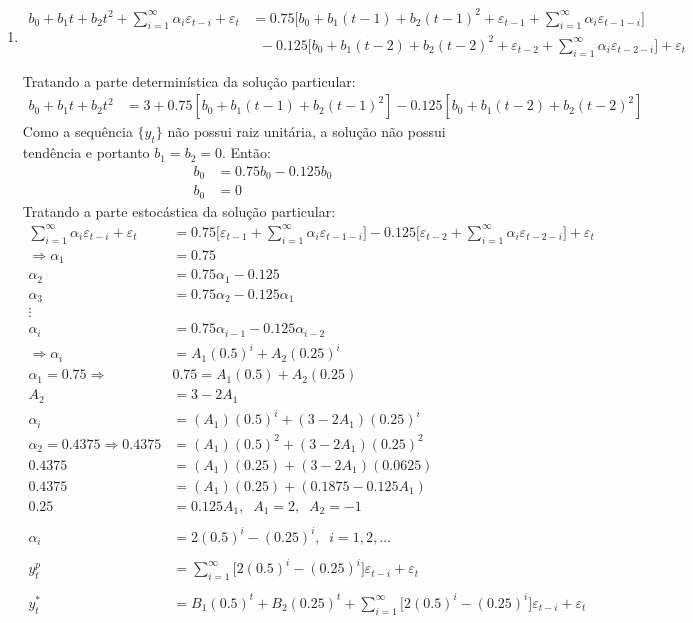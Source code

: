 \begin{enumerate}
\begin{enumerate}
		\item %
		\begin{align*}
			b_0+b_1t+b_2t^2+\sum\limits_{i=1}^{\infty}\alpha_i\varepsilon_{t-i}+\varepsilon_t&=0.75\Bigg[b_0+b_1(t-1)+b_2(t-1)^2+\varepsilon_{t-1}+\sum\limits_{i=1}^{\infty}\alpha_i\varepsilon_{t-1-i}\Bigg]\\
			&\;\;-0.125\Bigg[b_0+b_1(t-2)+b_2(t-2)^2+\varepsilon_{t-2}+\sum\limits_{i=1}^{\infty}\alpha_i\varepsilon_{t-2-i}\Bigg]+\varepsilon_t\\
			\\
		\end{align*}
		Tratando a parte determinística da solução particular:
		\begin{align*}
			b_0+b_1t+b_2t^2&=3+0.75[b_0+b_1(t-1)+b_2(t-1)^2]-0.125[b_0+b_1(t-2)+b_2(t-2)^2]
		\end{align*}
		Como a sequência $\{y_t\}$ não possui raiz unitária, a solução não possui tendência e portanto $b_1=b_2=0$. Então:
		\begin{align*}
			b_0&=0.75b_0-0.125b_0\\
			b_0&=0
		\end{align*}
		Tratando a parte estocástica da solução particular:
		\begin{align*}
			\sum\limits_{i=1}^{\infty}\alpha_i\varepsilon_{t-i}+\varepsilon_t&=0.75\Bigg[\varepsilon_{t-1}+\sum\limits_{i=1}^{\infty}\alpha_i\varepsilon_{t-1-i}\Bigg]-0.125\Bigg[\varepsilon_{t-2}+\sum\limits_{i=1}^{\infty}\alpha_i\varepsilon_{t-2-i}\Bigg]+\varepsilon_t\\
			\Rightarrow \alpha_1&=0.75\\
			\alpha_2&=0.75\alpha_1-0.125\\
			\alpha_3&=0.75\alpha_2-0.125\alpha_1\\
			\vdots&\\
			\alpha_i&=0.75\alpha_{i-1}-0.125\alpha_{i-2}\\
			\Rightarrow \alpha_i&=A_1(0.5)^i+A_2(0.25)^i\\
			\alpha_1=0.75 \Rightarrow&0.75=A_1(0.5)+A_2(0.25)\\
			A_2&=3-2A_1\\
			\alpha_i&=(A_1)(0.5)^i+(3-2A_1)(0.25)^i\\
			\alpha_2=0.4375 \Rightarrow 0.4375&=(A_1)(0.5)^2+(3-2A_1)(0.25)^2\\
			0.4375&=(A_1)(0.25)+(3-2A_1)(0.0625)\\
			0.4375&=(A_1)(0.25)+(0.1875-0.125A_1)\\
			0.25&=0.125A_1, \;\; A_1=2,\;\; A_2=-1\\
			\\
			\alpha_i&=2(0.5)^i-(0.25)^i, \;\; i=1,2,...\\
			\\
			y_t^p&=\sum\limits_{i=1}^{\infty}\Bigg[2(0.5)^i-(0.25)^i\Bigg]\varepsilon_{t-i}+\varepsilon_t\\
			\\
			y_t^*&=B_1(0.5)^t+B_2(0.25)^t+\sum\limits_{i=1}^{\infty}\Bigg[2(0.5)^i-(0.25)^i\Bigg]\varepsilon_{t-i}+\varepsilon_t
		\end{align*}
			

\end{enumerate}
\end{enumerate}
